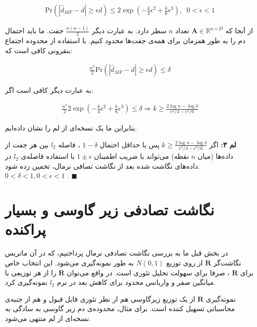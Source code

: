 \begin{align}
\mathrm{Pr} \left( \left| \hat{d}_{MF} - d \right| \geq \epsilon d \right) \leq 2 \exp \left( - \frac{k}{4} \epsilon^2 + \frac{k}{6} \epsilon^3 \right),\;\; 0 < \epsilon < 1
\label{eq:1iI}
\end{align}

از آنجا که 
$\mathbf{A} \in \mathbb{R}^{n \times D}$
تعداد 
$n$ 
سطر دارد. به عبارت دیگر 
$\frac{n(n-1)}{2}$
جفت. ما باید احتمال دم را به طور همزمان برای همه‌ی جفت‌ها محدود کنیم. با استفاده از محدوده اجتماع بنفرونی%
کافی است که:

\begin{align}
\frac{n^2}{2} \mathrm{Pr} \left( \left| \hat{d}_{MF} - d \right| \geq \epsilon d \right) \leq \delta
\label{eq:1iJ}
\end{align}

به عبارت دیگر کافی است اگر:

\begin{align}
\frac{n^2}{2} 2 \exp \left( - \frac{k}{4} \epsilon^2 + \frac{k}{6} \epsilon^3 \right) \leq \delta 
\Rightarrow
k \geq \frac{2 \log n - \log \delta}{\epsilon^2 / 4 - \epsilon^3 / 6}
\label{eq:1iK}
\end{align}

بنابراین ما یک نسخه‌ای از لم 
را نشان داده‌ایم.

\textbf{
لم ۳:
}
اگر 
$k \geq \frac{2 \log n - \log \delta}{\epsilon^2 / 4 - \epsilon^3 / 6} $
پس با حداقل احتمال 
$1-\delta$
، فاصله 
$l_2$
بین هر جفت از داده‌ها (میان 
$n$
نقطه) می‌تواند با ضریب اطمینان
$1 \pm \epsilon$
با استفاده فاصله‌ی 
$l_2$
در داده‌های نگاشت شده بعد از نگاشت تصافی نرمال، تخمین زده شود.
$0 < \delta < 1, 0 < \epsilon < 1$
.
$\blacksquare$
\bigskip



\section{
نگاشت تصادفی زیر گاوسی و بسیار پراکنده
}

در بخش قبل ما به بررسی نگاشت تصادفی نرمال پرداختیم، که در آن ماتریس نگاشت‌گر 
$\mathbf{R}$
از روی توزیع 
$N(0,1)$
به طور 
نمونه‌گیری می‌شود. این انتخاب خاص برای 
$\mathbf{R}$
، صرفا برای سهولت تحلیل تئوری است. در واقع می‌توان 
$\mathbf{R}$
را از هر توزیعی با میانگین صفر و واریانس محدود برای کاهش بعد در نرم 
$l_2$
نمونه‌گیری کرد.

نمونه‌گیری
$\mathbf{R}$
از یک توزیع زیرگاوسی
هم از نظر تئوری قابل قبول و هم از جنبه‌ی محاسباتی تسهیل کننده است. برای مثال، محدوده‌ی دم زیر گاوسی به سادگی به نسخه‌ای از لم
منتهی می‌شود. 

